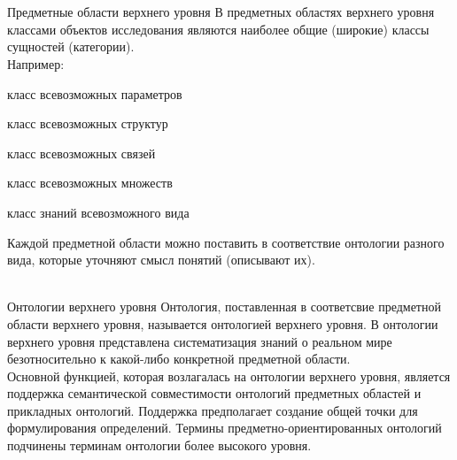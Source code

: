 \begin{frame}{\\}
	\begin{SCn}
	\end{SCn}
\end{frame}

\begin{frame}{\\Предметные области верхнего уровня}%
	\vspace{10mm}
	В предметных областях верхнего уровня классами объектов исследования являются наиболее общие (широкие) классы сущностей (категории). \\
	Например:
	\begin{textitemize}
		\item класс всевозможных параметров
		\item класс всевозможных структур
		\item класс всевозможных связей
		\item класс всевозможных множеств
		\item класс знаний всевозможного вида
	\end{textitemize}
	Каждой предметной области можно поставить в соответствие онтологии разного вида, которые уточняют смысл понятий (описывают их).
\end{frame}

\begin{frame}{\\Онтологии верхнего уровня}
	\vspace{10mm}
	 Онтология, поставленная в соответсвие предметной области верхнего уровня, называется онтологией верхнего уровня. В онтологии верхнего уровня представлена систематизация знаний о реальном мире безотносительно к какой-либо конкретной предметной области. \\\vspace{3mm}
	 Основной функцией, которая возлагалась на онтологии верхнего уровня, является поддержка семантической совместимости онтологий предметных областей и прикладных онтологий. Поддержка предполагает создание общей точки для формулирования определений. Термины предметно-ориентированных онтологий подчинены терминам онтологии более высокого уровня. \\
\end{frame}